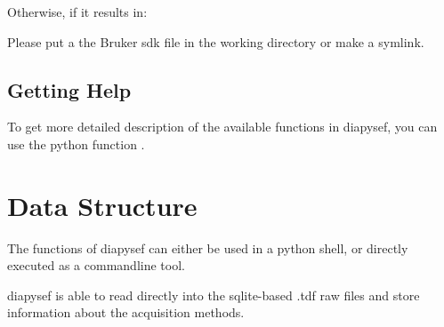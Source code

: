 \documentclass[letterpaper,10pt,english]{sphinxmanual}
\begin{document}
Otherwise, if it results in:

\begin{sphinxVerbatim}[commandchars=\\\{\}]
            
         
     
\end{sphinxVerbatim}

Please put a the Bruker sdk file in the working directory or make a symlink.


\section{Getting Help}
\label{\detokenize{convenientfunctions:getting-help}}
To get more detailed description of the available functions in diapysef, you can use
the python function .

\begin{sphinxVerbatim}[commandchars=\\\{\}]
 
\end{sphinxVerbatim}


\chapter{Data Structure}
\label{\detokenize{convenientfunctions:data-structure}}
The functions of diapysef can either be used in a python shell, or directly executed
as a commandline tool.

diapysef is able to read directly into the sqlite-based .tdf raw files and store
information about the acquisition methods.

\begin{sphinxVerbatim}[commandchars=\\\{\}]
   
  
  
\end{sphinxVerbatim}
\end{document}
